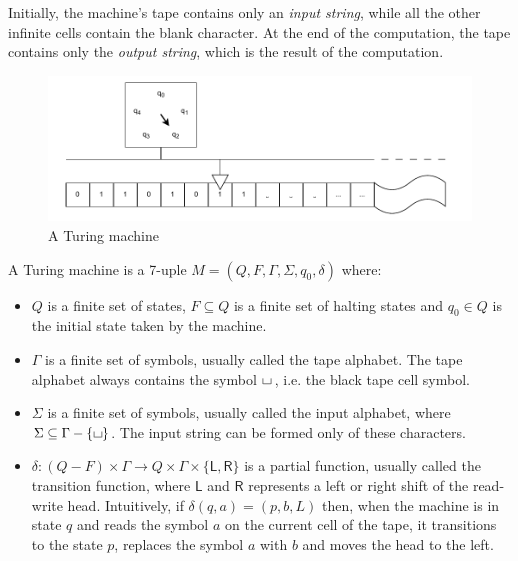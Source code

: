 Initially, the machine's tape contains only an \textit{input string}, while all the other infinite cells contain the blank character. At the end of the computation, the tape contains only the \textit{output string}, which is the result of the computation.

\begin{figure}[H]
    \centering
    \includegraphics[scale=0.75]{resources/images/tm.pdf}

    \caption{A Turing machine}
\end{figure}

\newpage

\begin{definition}
 A Turing machine is a 7-uple $M = (Q, F, \Gamma, \Sigma, q_0, \delta)$ where:
    \begin{itemize}
        \item $Q$ is a finite set of states, $F \subseteq Q$ is a finite set of halting states and $q_0 \in Q$ is the initial state taken by the machine.
        \item $\Gamma$ is a finite set of symbols, usually called the tape alphabet. The tape alphabet always contains the symbol $\blankchar\,$, i.e. the black tape cell symbol.
        \item $\Sigma$ is a finite set of symbols, usually called the input alphabet, where $\Sigma \subseteq \Gamma - \{\blankchar\}$. The input string can be formed only of these characters.
        \item $\delta : (Q - F) \times \Gamma \to Q \times \Gamma \times \{\mathsf{L}, \mathsf{R}\}$ is a partial function, usually called the transition function, where $\mathsf{L}$ and $\mathsf{R}$ represents a left or right shift of the read-write head. Intuitively, if $\delta(q, a) = (p, b, L)$ then, when the machine is in state $q$ and reads the symbol $a$ on the current cell of the tape, it transitions to the state $p$, replaces the symbol $a$ with $b$ and moves the head to the left.
    \end{itemize}
\end{definition}

